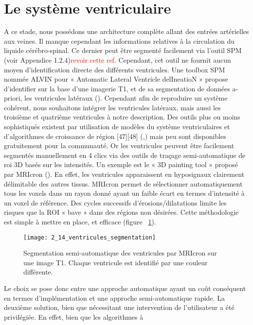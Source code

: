 \section{Le système ventriculaire}
\label{sec:syst_ventr}
A ce stade, nous possédons une architecture complète allant des entrées artérielles aux veines. Il manque cependant les informations relatives à la circulation du liquide cérébro-spinal. Ce dernier peut être segmenté facilement via l’outil SPM (voir Appendice 1.2.4)\textcolor{red}{revoir cette ref}. Cependant, cet outil ne fournit aucun moyen d’identification directe des différents ventricules. Une toolbox SPM nommée ALVIN pour « Automatic Lateral Ventricle delIneatioN » propose d’identifier sur la base d’une imagerie T1, et de sa segmentation de données a-priori, les ventricules latéraux (\cite{Kempton2011}). Cependant afin de reproduire un système cohérent, nous souhaitons intégrer les ventricules latéraux, mais aussi les troisième et quatrième ventricules à notre description. Des outils plus ou moins sophistiqués existent par utilisation de modèles du système ventriculaires et d’algorithmes de croissance de région [47][48] (\cite{Liu2009},\cite{Schnack2001}) mais peu sont disponibles gratuitement pour la communauté. Or les ventricules peuvent être facilement segmentés manuellement en 4 clics via des outils de traçage semi-automatique de roi 3D basés sur les intensités. Un exemple est le « 3D painting tool » proposé par MRIcron (\cite{Rorden2007}). En effet, les ventricules apparaissent en hyposignaux clairement délimitable des autres tissus. MRIcron permet de sélectionner automatiquement tous les voxels dans un rayon donné ayant un faible écart en termes d’intensité à un voxel de référence. Des cycles successifs d’érosions/dilatations limite les risques que la ROI « bave » dans des régions non désirées. Cette méthodologie est simple à mettre en place, et efficace (figure ~\ref{fig:2_14_ventricules_segmentes}). \\
\begin{figure}[!t]
\centering
\texttt{[image: 2\_14\_ventricules\_segmentation]}
\caption{Segmentation semi-automatique des ventricules par MRIcron sur une image T1. Chaque ventricule est identifié
par une couleur différente.}
\label{fig:2_14_ventricules_segmentes}	
\end{figure}	
Le choix se pose donc entre une approche automatique ayant un coût conséquent en termes
d’implémentation et une approche semi-automatique rapide. La deuxième solution, bien que
nécessitant une intervention de l’utilisateur a été privilégiée. En effet, bien que les algorithmes à
